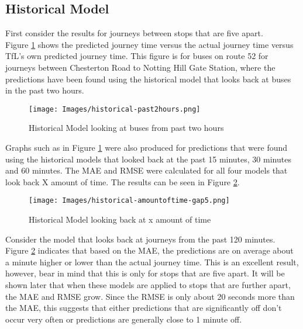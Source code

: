 \subsection{Historical Model}

First consider the results for journeys between stops that are five apart. \\

Figure \ref{fig:historical-past2hours} shows the predicted journey time versus the actual journey time versus TfL's own predicted journey time. This figure is for buses on route 52 for journeys between Chesterton Road to Notting Hill Gate Station, where the predictions have been found using the historical model that looks back at buses in the past two hours. 

\begin{figure}[H]
\begin{center}
    \texttt{[image: Images/historical-past2hours.png]}
    \caption{Historical Model looking at buses from past two hours}
    \label{fig:historical-past2hours}
\end{center}
\end{figure}

Graphs such as in Figure \ref{fig:historical-past2hours} were also produced for predictions that were found using the historical models that looked back at the past 15 minutes, 30 minutes and 60 minutes. The MAE and RMSE were calculated for all four models that look back X amount of time. The results can be seen in Figure \ref{fig:historical-lookingbacktime}. 

\begin{figure}[H]
\begin{center}
    \texttt{[image: Images/historical-amountoftime-gap5.png]}
    \caption{Historical Model looking back at x amount of time}
    \label{fig:historical-lookingbacktime}
\end{center}
\end{figure}

Consider the model that looks back at journeys from the past 120 minutes. Figure \ref{fig:historical-lookingbacktime} indicates that based on the MAE, the predictions are on average about a minute higher or lower than the actual journey time. This is an excellent result, however, bear in mind that this is only for stops that are five apart. It will be shown later that when these models are applied to stops that are further apart, the MAE and RMSE grow. Since the RMSE is only about 20 seconds more than the MAE, this suggests that either predictions that are significantly off don't occur very often or predictions are generally close to 1 minute off. \\


